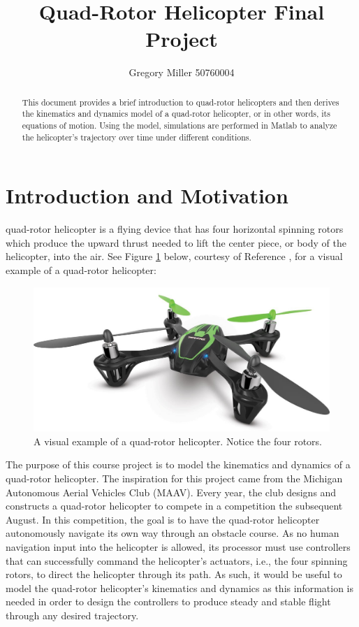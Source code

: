 \documentclass[journal]{IEEEtran}
\begin{document}
\title{Quad-Rotor Helicopter Final Project}

\author{{Gregory Miller 50760004}}

{}

\maketitle

\begin{abstract}
This document provides a brief introduction to quad-rotor helicopters and then derives the kinematics and dynamics model of a quad-rotor helicopter, or in other words, its equations of motion. Using the model, simulations are performed in Matlab to analyze the helicopter's trajectory over time under different conditions. 
\end{abstract}

\IEEEpeerreviewmaketitle

\section{Introduction and Motivation}
\label{sec:intro_section}

quad-rotor helicopter is a flying device that has four horizontal spinning rotors which produce the upward thrust needed to lift the center piece, or body of the helicopter, into the air. See Figure \ref{fig:quad_intro} below, courtesy of Reference \cite{quad_intro}, for a visual example of a quad-rotor helicopter:

\begin{figure}[ht]
    \centering
        \includegraphics[width=.30\textwidth]{quad_intro}
    \caption{A visual example of a quad-rotor helicopter. Notice the four rotors.}
    \label{fig:quad_intro}
\end{figure}

 The purpose of this course project is to model the kinematics and dynamics of a quad-rotor helicopter. The inspiration for this project came from the Michigan Autonomous Aerial Vehicles Club (MAAV). Every year, the club designs and constructs a quad-rotor helicopter to compete in a competition the subsequent August. In this competition, the goal is to have the quad-rotor helicopter autonomously navigate its own way through an obstacle course. As no human navigation input into the helicopter is allowed, its processor must use controllers that can successfully command the helicopter's actuators, i.e., the four spinning rotors, to direct the helicopter through its path. As such, it would be useful to model the quad-rotor helicopter's kinematics and dynamics as this information is needed in order to design the controllers to produce steady and stable flight through any desired trajectory.   
\end{document}

